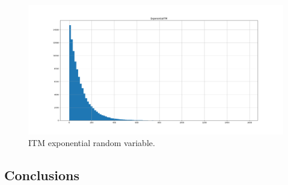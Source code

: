 \documentclass{article}
\begin{document}
  \begin{figure}
    \caption{ITM exponential random variable.}
    \centering
      \includegraphics[width=\linewidth]{exponentialITM.png}
  \end{figure}
  \subsection{Conclusions}
\end{document}

